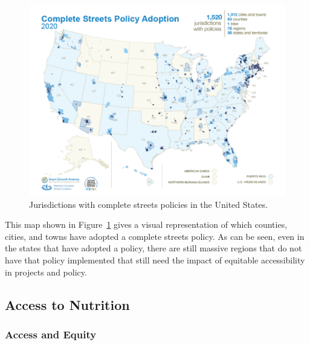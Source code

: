 \documentclass[
  letterpaper,
  authoryear,
  review,
  3p]{elsarticle}
\begin{document}
\begin{figure}

{\centering \includegraphics[width=6in,height=\textheight]{images/completestreets.png}

}

\caption{\label{fig-completestreets}Jurisdictions with complete streets
policies in the United States.}

\end{figure}

This map shown in Figure~\ref{fig-completestreets} gives a visual
representation of which counties, cities, and towns have adopted a
complete streets policy. As can be seen, even in the states that have
adopted a policy, there are still massive regions that do not have that
policy implemented that still need the impact of equitable accessibility
in projects and policy.

\hypertarget{access-to-nutrition}{%
\subsection{Access to Nutrition}\label{access-to-nutrition}}

\hypertarget{access-and-equity}{%
\subsubsection{Access and Equity}\label{access-and-equity}}
\end{document}
